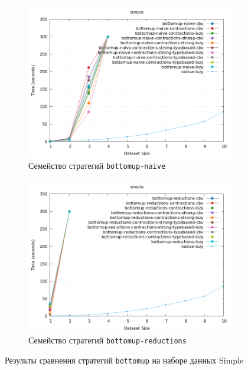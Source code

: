 \documentclass[../diploma.tex]{subfiles}
\begin{document}
\begin{figure}[h]
    \begin{subfigure}{0.5\textwidth}
    \includegraphics[width=\linewidth]{bottomup.png} 
    \caption{Семейство стратегий \texttt{bottomup-naive}}
    \end{subfigure}
    \begin{subfigure}{0.5\textwidth}
    \includegraphics[width=\linewidth]{bottomup_reductions.png}
    \caption{Семейство стратегий \texttt{bottomup-reductions}}
    \end{subfigure}
    \caption{Результы сравнения стратегий \texttt{bottomup} на наборе данных Simple}
    \label{plot_bottomup}
\end{figure}
\end{document}

